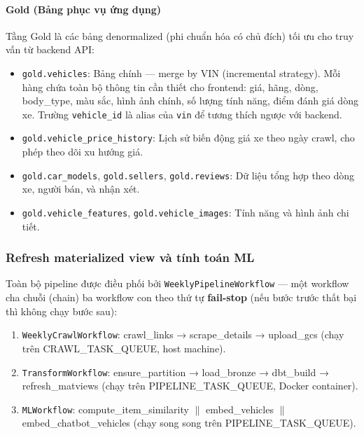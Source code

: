 \paragraph{Gold (Bảng phục vụ ứng dụng)}

Tầng Gold là các bảng denormalized (phi chuẩn hóa có chủ đích) tối ưu cho truy vấn từ backend API:

\begin{itemize}
    \item \texttt{gold.vehicles}: Bảng chính — merge by VIN (incremental strategy). Mỗi hàng chứa toàn bộ thông tin cần thiết cho frontend: giá, hãng, dòng, body\_type, màu sắc, hình ảnh chính, số lượng tính năng, điểm đánh giá dòng xe. Trường \texttt{vehicle\_id} là alias của \texttt{vin} để tương thích ngược với backend.
    \item \texttt{gold.vehicle\_price\_history}: Lịch sử biến động giá xe theo ngày crawl, cho phép theo dõi xu hướng giá.
    \item \texttt{gold.car\_models}, \texttt{gold.sellers}, \texttt{gold.reviews}: Dữ liệu tổng hợp theo dòng xe, người bán, và nhận xét.
    \item \texttt{gold.vehicle\_features}, \texttt{gold.vehicle\_images}: Tính năng và hình ảnh chi tiết.
\end{itemize}

\subsubsection{Refresh materialized view và tính toán ML}

Toàn bộ pipeline được điều phối bởi \texttt{WeeklyPipelineWorkflow} — một workflow cha chuỗi (chain) ba workflow con theo thứ tự \textbf{fail-stop} (nếu bước trước thất bại thì không chạy bước sau):

\begin{enumerate}
    \item \texttt{WeeklyCrawlWorkflow}: crawl\_links → scrape\_details → upload\_gcs (chạy trên CRAWL\_TASK\_QUEUE, host machine).
    \item \texttt{TransformWorkflow}: ensure\_partition → load\_bronze → dbt\_build → refresh\_matviews (chạy trên PIPELINE\_TASK\_QUEUE, Docker container).
    \item \texttt{MLWorkflow}: compute\_item\_similarity $\parallel$ embed\_vehicles $\parallel$ embed\_chatbot\_vehicles (chạy song song trên PIPELINE\_TASK\_QUEUE).
\end{enumerate}

